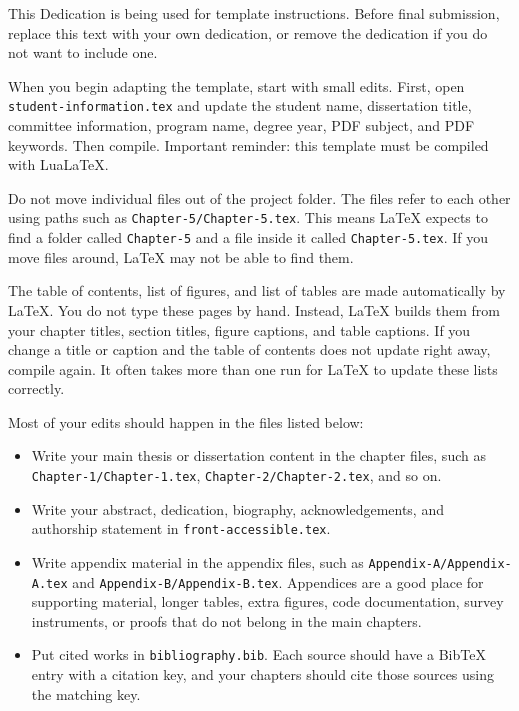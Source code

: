 \begin{dedication}

This Dedication is being used for template instructions. Before final submission, replace this text with your own dedication, or remove the dedication if you do not want to include one.

When you begin adapting the template, start with small edits. First, open \texttt{student-information.tex} and update the student name, dissertation title, committee information, program name, degree year, PDF subject, and PDF keywords. Then compile. Important reminder: this template must be compiled with LuaLaTeX.

Do not move individual files out of the project folder. The files refer to each other using paths such as \texttt{Chapter-5/Chapter-5.tex}. This means LaTeX expects to find a folder called \texttt{Chapter-5} and a file inside it called \texttt{Chapter-5.tex}. If you move files around, LaTeX may not be able to find them.

The table of contents, list of figures, and list of tables are made automatically by LaTeX. You do not type these pages by hand. Instead, LaTeX builds them from your chapter titles, section titles, figure captions, and table captions. If you change a title or caption and the table of contents does not update right away, compile again. It often takes more than one run for LaTeX to update these lists correctly.

Most of your edits should happen in the files listed below:

\begin{itemize}
  \item Write your main thesis or dissertation content in the chapter files, such as \texttt{Chapter-1/Chapter-1.tex}, \texttt{Chapter-2/Chapter-2.tex}, and so on.

  \item Write your abstract, dedication, biography, acknowledgements, and authorship statement in \texttt{front-accessible.tex}.

  \item Write appendix material in the appendix files, such as \texttt{Appendix-A/Appendix-A.tex} and \texttt{Appendix-B/Appendix-B.tex}. Appendices are a good place for supporting material, longer tables, extra figures, code documentation, survey instruments, or proofs that do not belong in the main chapters.

  \item Put cited works in \texttt{bibliography.bib}. Each source should have a BibTeX entry with a citation key, and your chapters should cite those sources using the matching key.


\end{itemize}
\end{dedication}
